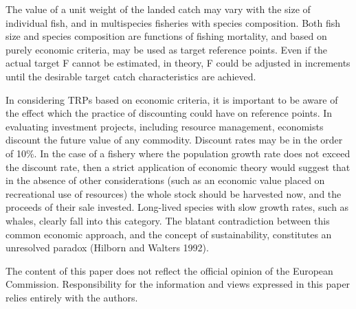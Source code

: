 \documentclass[12pt,oneline,a4paper,numbib]{ouparticle}
\numberwithin{equation}{subsection} %
\begin{document}
The value of a unit weight of the landed catch may vary with the size of individual fish, and in multispecies fisheries with species composition. Both fish size and species composition are functions of fishing mortality, and based on purely economic criteria, may be used as target reference points. Even if the actual target F cannot be estimated, in theory, F could be adjusted in increments until the desirable target catch characteristics are achieved.

In considering TRPs based on economic criteria, it is important to be aware of the effect which the practice of discounting could have on reference points. In evaluating investment projects, including resource management, economists discount the future value of any commodity. Discount rates may be in the order of 10\%. In the case of a fishery where the population growth rate does not exceed the discount rate, then a strict application of economic theory would suggest that in the absence of other considerations (such as an economic value placed on recreational use of resources) the whole stock should be harvested now, and the proceeds of their sale invested. Long-lived species with slow growth rates, such as whales, clearly fall into this category. The blatant contradiction between this common economic approach, and the concept of sustainability, constitutes an unresolved paradox (Hilborn and Walters 1992).

\begin{notes}[Acknowledgements]
The content of this paper does not reflect the official opinion of the European Commission. Responsibility for the information and views expressed in this paper relies entirely with the authors.
\end{notes}




\end{document}
